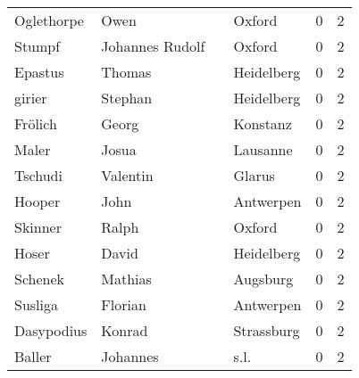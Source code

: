 \documentclass[10pt,a4paper,landscape]{article}
\begin{document}
\begin{longtable}{llllrr}
               Oglethorpe &                               Owen &             &                                      Oxford &          0 &         2 \\
                   Stumpf &                    Johannes Rudolf &             &                                      Oxford &          0 &         2 \\
                  Epastus &                             Thomas &             &                                  Heidelberg &          0 &         2 \\
                   girier &                            Stephan &             &                                  Heidelberg &          0 &         2 \\
                  Frölich &                              Georg &             &                                    Konstanz &          0 &         2 \\
                    Maler &                              Josua &             &                                    Lausanne &          0 &         2 \\
                  Tschudi &                           Valentin &             &                                      Glarus &          0 &         2 \\
                   Hooper &                               John &             &                                   Antwerpen &          0 &         2 \\
                  Skinner &                              Ralph &             &                                      Oxford &          0 &         2 \\
                    Hoser &                              David &             &                                  Heidelberg &          0 &         2 \\
                  Schenek &                            Mathias &             &                                    Augsburg &          0 &         2 \\
                  Susliga &                            Florian &             &                                   Antwerpen &          0 &         2 \\
               Dasypodius &                             Konrad &             &                                  Strassburg &          0 &         2 \\
                   Baller &                           Johannes &             &                                        s.l. &          0 &         2 \\

\end{longtable}
\end{document}
